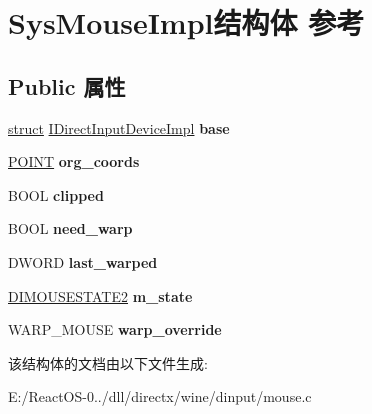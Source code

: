 \hypertarget{struct_sys_mouse_impl}{}\section{Sys\+Mouse\+Impl结构体 参考}
\label{struct_sys_mouse_impl}
\subsection*{Public 属性}
\begin{DoxyCompactItemize}
\item 
\mbox{\label{struct_sys_mouse_impl_a9f9da984c6abe73460264a5ee6394110}} 
\hyperlink{interfacestruct}{struct} \hyperlink{struct_i_direct_input_device_impl}{I\+Direct\+Input\+Device\+Impl} {\bfseries base}
\item 
\mbox{\label{struct_sys_mouse_impl_a99755190b6ca76293e5b2677b684a62a}} 
\hyperlink{structtag_p_o_i_n_t}{P\+O\+I\+NT} {\bfseries org\+\_\+coords}
\item 
\mbox{\label{struct_sys_mouse_impl_a25156eb8ab48087398a753cf78bdd6da}} 
B\+O\+OL {\bfseries clipped}
\item 
\mbox{\label{struct_sys_mouse_impl_aebca90dd362aef7920cc802fcf45b49a}} 
B\+O\+OL {\bfseries need\+\_\+warp}
\item 
\mbox{\label{struct_sys_mouse_impl_ab9da0d21edc3dc953c29ff3db0117a72}} 
D\+W\+O\+RD {\bfseries last\+\_\+warped}
\item 
\mbox{\label{struct_sys_mouse_impl_aa1d811c8d227e4c0a53cf2f73088ac7f}} 
\hyperlink{struct_d_i_m_o_u_s_e_s_t_a_t_e2}{D\+I\+M\+O\+U\+S\+E\+S\+T\+A\+T\+E2} {\bfseries m\+\_\+state}
\item 
\mbox{\label{struct_sys_mouse_impl_a4618d7380585fd6f604597c9b7348431}} 
W\+A\+R\+P\+\_\+\+M\+O\+U\+SE {\bfseries warp\+\_\+override}
\end{DoxyCompactItemize}


该结构体的文档由以下文件生成\+:\begin{DoxyCompactItemize}
\item 
E\+:/\+React\+O\+S-\/0../dll/directx/wine/dinput/mouse.\+c\end{DoxyCompactItemize}
